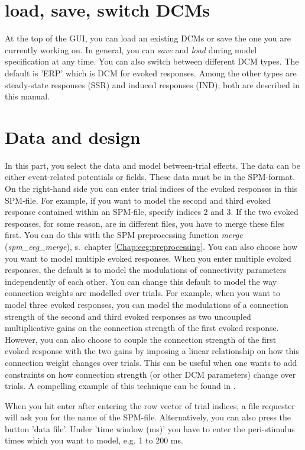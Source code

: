\section{load, save, switch DCMs}
At the top of the GUI, you can load an existing DCMs or save the one
you are currently working on. In general, you can \textit{save} and
\textit{load} during model specification at any time. You can also
switch between different DCM types. The default is 'ERP' which is DCM
for evoked responses. Among the other types are steady-state responses
(SSR) and induced responses (IND); both are described in this
manual. 

\section{Data and design}
In this part, you select the data and model between-trial
effects. The data can be either event-related 
potentials or fields. These data must be in the SPM-format. On the
right-hand side you can enter trial indices of the evoked responses in
this SPM-file. For example, if you want to model the
second and third evoked response contained within an SPM-file, specify
indices 2 and 3. If the two evoked responses, for some reason, are in
different files, you have to merge these files first. You can do this
with the SPM preprocessing function \textit{merge}
(\textit{spm\_eeg\_merge}), s.~chapter
\ref{Chap:eeg:preprocessing}. You can also choose how you want to
model multiple evoked responses. When you enter multiple evoked
responses, the default is to model the modulations of connectivity
parameters independently of each other. You can change this default to
model the way connection weights are modelled over trials. For
example, when you want to model three evoked responses, you can model
the modulations of a connection strength of the second and third
evoked responses as two uncoupled multiplicative gains on the connection
strength of the first evoked response. However, you can also choose to
couple the connection strength of the first evoked response with the
two gains by imposing a linear relationship on how this connection
weight changes over trials. This can be useful when one wants to add
constraints on how connection strength (or other DCM parameters)
change over trials. A compelling example of this technique can be
found in \cite{marta_mmndcm}.

When you hit enter after entering the
row vector of trial indices, a file requester will ask you for the
name of the SPM-file. Alternatively, you can also press the button
'data file'. Under 'time window (ms)' you have to enter the
peri-stimulus times which you want to model, e.g. 1 to 200 ms. 

